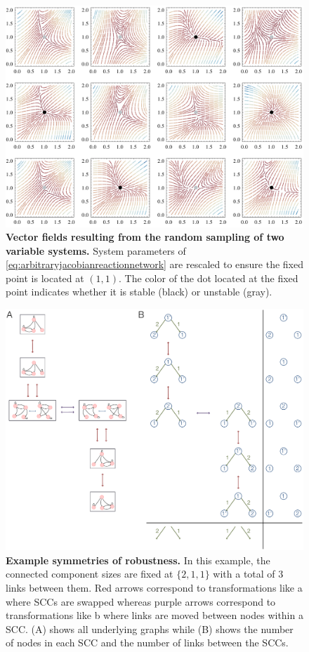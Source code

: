 
\begin{figure}[!ht]
\centering
\noindent\includegraphics[width=0.9\columnwidth]{fig/jacobianvectorfields.pdf}
\caption{{\bf Vector fields resulting from the random sampling of two variable systems.} System parameters of \ref{eq:arbitraryjacobianreactionnetwork} are rescaled to ensure the fixed point is located at $(1,1)$. The color of the dot located at the fixed point indicates whether it is stable (black) or unstable (gray).}
\label{fig:jacobianvectorfields}
\end{figure}

\pagebreak

\begin{figure}[!ht]
\centering
\noindent\includegraphics[width=0.9\columnwidth]{fig/robustnesssymmetries.pdf}
\caption{{\bf Example symmetries of robustness.} In this example, the connected component sizes are fixed at $\{2,1,1\}$ with a total of $3$ links between them. Red arrows correspond to transformations like  a where SCCs are swapped whereas purple arrows correspond to transformations like  b where links are moved between nodes within a SCC. (A) shows all underlying graphs while (B) shows the number of nodes in each SCC and the number of links between the SCCs.}
\label{fig:robustnesssymmetries}
\end{figure}

